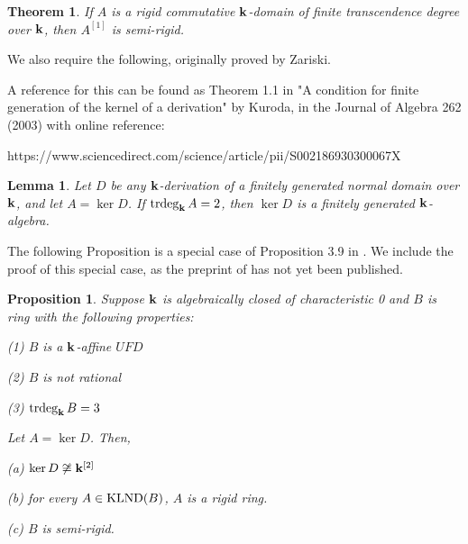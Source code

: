 \documentclass[12pt]{amsart}
\theoremstyle{plain}
\newcommand{\red}{\color{red}}
\newtheorem{theorem}[subsection]{Theorem}
\newtheorem{proposition}[subsection]{Proposition}
\newtheorem{lemma}[subsection]{Lemma}
\theoremstyle{definition}
\newcommand{\trdeg}{	\operatorname{{\rm trdeg}}}
\newcommand{\bk}{{\ensuremath{\rm \bf k}}}
\newcommand{\klnd}{\operatorname{{\rm KLND}}}
\newcommand{\isom}{\cong}
\begin{document}
	\begin{theorem} \label{semirigidityTheorem}
		If $A$ is a rigid commutative $\bk$-domain of finite transcendence degree over $\bk$, then $A^{[1]}$ is semi-rigid.
	\end{theorem}
	
	We also require the following, originally proved by Zariski. {\red A reference for this can be found as Theorem 1.1 in "A condition for finite generation of the kernel of a derivation" by Kuroda, in the Journal of Algebra 262 (2003) with online reference:
		
		https://www.sciencedirect.com/science/article/pii/S002186930300067X
	}
	
	\begin{lemma}\label{fgkerneldim2}
		Let $D$ be any $\bk$-derivation of a finitely generated normal domain over $\bk$, and let $A = \ker D$. If $\trdeg_\bk A = 2$, then $\ker D$ is a finitely generated $\bk$-algebra.  
	\end{lemma}
	
	The following Proposition is a special case of Proposition 3.9 in \cite{lndsStructure}. We include the proof of this special case, as the preprint of \cite{lndsStructure} has not yet been published. 
	
	\begin{proposition}\label{trdeg3UFDnotRat}
		Suppose $\bk$ is algebraically closed of characteristic 0 and $B$ is ring with the following properties:
		
		(1) $B$ is a $\bk$-affine $UFD$
		
		(2) $B$ is not rational
		
		(3) $\trdeg_\bk B = 3$
		
		Let $A = \ker D$. Then,
		
		(a) $\ker D \not\isom \bk^{[2]}$
		
		(b) for every $A \in \klnd(B)$, $A$ is a rigid ring.
		
		(c) $B$ is semi-rigid. 
		
	\end{proposition}
	
\end{document}
